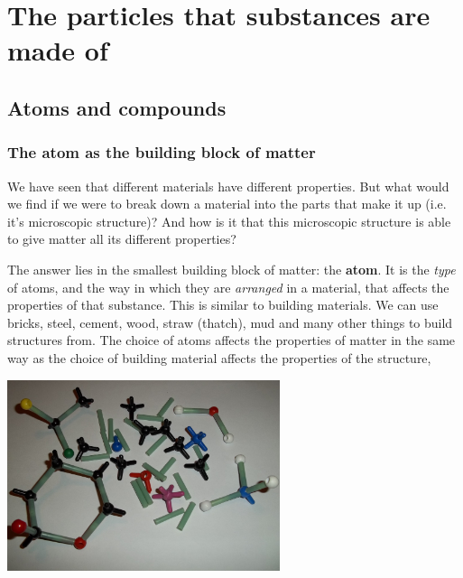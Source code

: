          \chapter{The particles that substances are made of}
\label{chap:composition}
    \setcounter{figure}{1}
    \setcounter{subfigure}{1}
    \label{m38120}
\section{Atoms and compounds}
\subsection*{The atom as the building block of matter}
            \nopagebreak
\label{m38120*id307092}We have seen that different materials have different properties. But what would we find if we were to break down a material into the parts that make it up (i.e. it's microscopic structure)? And how is it that this microscopic structure is able to give matter all its different properties?\par 
{}
\begin{minipage}{.6\textwidth}
\label{m38120*id307099}The answer lies in the smallest building block of  matter: the \textbf{atom}. It is the \textsl{type} of atoms, and the way in which they are \textsl{arranged} in a material, that affects the properties of that substance. This is similar to building materials. We can use bricks, steel, cement, wood, straw (thatch), mud and many other things to build structures from. The choice of atoms affects the properties of matter in the same way as the choice of building material affects the properties of the structure, \par 
\end{minipage}
\begin{minipage}{.4\textwidth}
 \begin{center}
\includegraphics[width=0.6\textwidth]{photos/atom_model_kit.jpg}
 \end{center}
\end{minipage}

